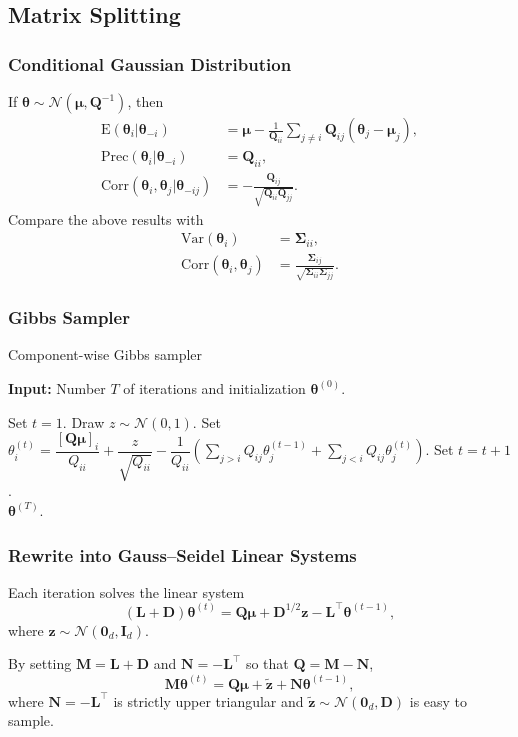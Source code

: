\documentclass[aspectratio=169]{beamer}
\newcommand{\B}[1]{\mathbf{#1}} %
\newcommand{\Bs}[1]{\boldsymbol{#1}} %
\newcommand{\pr}[1]{\left(#1\right)} %
\begin{document}
\subsection{Matrix Splitting}
\begin{frame}
\frametitle{Conditional Gaussian Distribution}
If $\Bs{\theta} \sim \mathcal{N}(\Bs{\mu},\B{Q}^{-1})$, then
\[
\begin{aligned}
\text{E}(\Bs{\theta}_i | \Bs{\theta}_{-i}) &= \Bs{\mu} - \frac{1}{\B{Q}_{ii} }\sum_{j\ne i} \B{Q}_{ij} (\Bs{\theta}_j - \Bs{\mu}_j), \\
\text{Prec}(\Bs{\theta}_i | \Bs{\theta}_{-i}) &= \B{Q}_{ii}, \\
\text{Corr}(\Bs{\theta}_i, \Bs{\theta}_j | \Bs{\theta}_{-ij}) &= -\frac{\B{Q}_{ij}}{\sqrt{\B{Q}_{ii}\B{Q}_{jj}}}.
\end{aligned}
\]
Compare the above results with
\[
\begin{aligned}
\text{Var}(\Bs{\theta}_i) &= \Bs{\Sigma}_{ii}, \\
\text{Corr}(\Bs{\theta}_i, \Bs{\theta}_j) &= \frac{\Bs{\Sigma}_{ij}}{\sqrt{\Bs{\Sigma}_{ii}\Bs{\Sigma}_{jj}}}.
\end{aligned}
\]
\end{frame}

\begin{frame}
\frametitle{Gibbs Sampler}
\begin{algorithm}[H]
\caption{Component-wise Gibbs sampler}
\hspace*{\algorithmicindent} \textbf{Input:} Number $T$ of iterations and initialization $\Bs{\theta}^{(0)}$.
\begin{algorithmic}[1]
\State Set $t = 1$.
    \State Draw $z \sim \mathcal{N}(0,1)$.
    \State Set $\theta^{(t)}_i = \dfrac{[\B{Q}\Bs{\mu}]_i}{Q_{ii}} + \dfrac{z}{\sqrt{Q_{ii}}} - \dfrac{1}{Q_{ii}}\pr{\displaystyle\sum_{j > i}Q_{ij}\theta_j^{(t-1)} + \displaystyle\sum_{j < i}Q_{ij}\theta_j^{(t)}}$.
    \EndFor
    \State Set $t = t + 1$.
\EndWhile\\
\Return $\Bs{\theta}^{(T)}$.
\end{algorithmic}
\end{algorithm}
\end{frame}

\begin{frame}
\frametitle{Rewrite into Gauss--Seidel Linear Systems}
Each iteration solves the linear system
\[(\B{L} + \B{D})\Bs{\theta}^{(t)} = \B{Q}\Bs{\mu} + \B{D}^{1/2}\B{z} - \B{L}^{\top}\Bs{\theta}^{(t-1)},\]
where $\B{z} \sim \mathcal{N}(\B{0}_d,\B{I}_d)$.

By setting $\B{M} = \B{L}+\B{D}$ and $\B{N} = -\B{L}^{\top}$ so that $\B{Q} = \B{M} - \B{N}$,
\[
  \B{M}\Bs{\theta}^{(t)} = \B{Q}\Bs{\mu} +  \tilde{\B{z}}+\B{N}\Bs{\theta}^{(t-1)},
\]
where $\B{N} = -\B{L}^{\top}$ is strictly upper triangular and $\tilde{\B{z}} \sim \mathcal{N}(\B{0}_d,\B{D})$ is easy to sample.
\end{frame}
\end{document}
